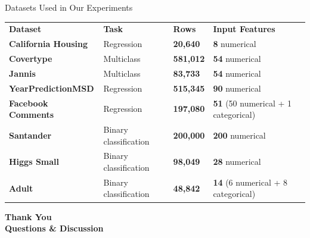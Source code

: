 \documentclass[aspectratio=169, xcolor=table]{beamer}
\begin{document}
\begin{frame}{Datasets Used in Our Experiments}
    \begin{table}
        \centering
        \renewcommand{\arraystretch}{1.3}
        \footnotesize
        \begin{tabular}{l | l | l | l}
            \rowcolor{PrimaryColor} \color{white}\textbf{Dataset} & \color{white}\textbf{Task} & \color{white}\textbf{Rows} & \color{white}\textbf{Input Features} \\
            \textbf{California Housing} & Regression & \textbf{20,640} & \textbf{8} numerical \\
            \textbf{Covertype} & Multiclass & \textbf{581,012} & \textbf{54} numerical \\
            \textbf{Jannis} & Multiclass & \textbf{83,733} & \textbf{54} numerical \\
            \textbf{YearPredictionMSD} & Regression & \textbf{515,345} & \textbf{90} numerical \\
            \textbf{Facebook Comments} & Regression & \textbf{197,080} & \textbf{51} (50 numerical + 1 categorical) \\
            \textbf{Santander} & Binary classification & \textbf{200,000} & \textbf{200} numerical \\
            \textbf{Higgs Small} & Binary classification & \textbf{98,049} & \textbf{28} numerical \\
            \textbf{Adult} & Binary classification & \textbf{48,842} & \textbf{14} (6 numerical + 8 categorical) \\
        \end{tabular}
    \end{table}
\end{frame}

\begin{frame}[plain]
    \vfill
    \begin{center}
        \vspace{0.8cm}
        \textcolor{PrimaryColor}{\Huge \textbf{Thank You}} \\
        \vspace{0.8cm}
        \large \textbf{Questions \& Discussion} \\
    \end{center}
    \vfill
\end{frame}
\end{document}
